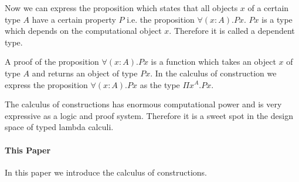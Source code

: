 \begin{enumerate}
Now we can express the proposition which states that all objects $x$ of a
certain type $A$ have a certain property $P$ i.e. the proposition $\forall
(x:A). P x$. $P x$ is a type which depends on the computational object $x$.
Therefore it is called a dependent type.

A proof of the proposition $\forall (x: A). P x$ is a function which takes an
object $x$ of type $A$ and returns an object of type $P x$. In the calculus of
construction we express the proposition $\forall (x: A). P x$ as the type $\Pi
x^A. P x$.
\end{enumerate}


The calculus of constructions has enormous computational power and is very
expressive as a logic and proof system. Therefore it is a sweet spot in the
design space of typed lambda calculi.



\paragraph{This Paper}
%
In this paper we introduce the calculus of constructions.

